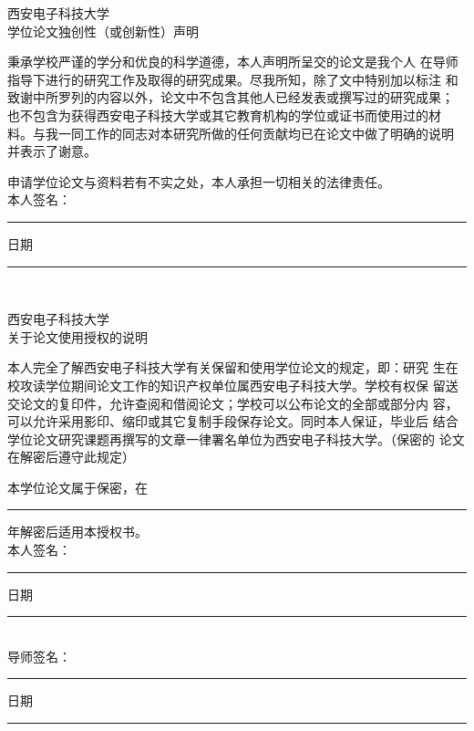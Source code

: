 \begin{center}
\heiti{}西安电子科技大学\\[5mm]
	学位论文独创性（或创新性）声明
\end{center}\vspace{1cm}

\songti{}秉承学校严谨的学分和优良的科学道德，本人声明所呈交的论文是我个人
在导师指导下进行的研究工作及取得的研究成果。尽我所知，除了文中特别加以标注
和致谢中所罗列的内容以外，论文中不包含其他人已经发表或撰写过的研究成果；
也不包含为获得西安电子科技大学或其它教育机构的学位或证书而使用过的材
料。与我一同工作的同志对本研究所做的任何贡献均已在论文中做了明确的说明
并表示了谢意。

申请学位论文与资料若有不实之处，本人承担一切相关的法律责任。\\[3mm]

	本人签名：\rule{2.6cm}{0.75pt}  \hspace{3cm}  日期\rule{3cm}{0.75pt}\\[2cm]
	
\begin{center}
\heiti{}西安电子科技大学\\[5mm]
	关于论文使用授权的说明
\end{center}\vspace{1cm}

\songti{}本人完全了解西安电子科技大学有关保留和使用学位论文的规定，即：研究
生在校攻读学位期间论文工作的知识产权单位属西安电子科技大学。学校有权保
留送交论文的复印件，允许查阅和借阅论文；学校可以公布论文的全部或部分内
容，可以允许采用影印、缩印或其它复制手段保存论文。同时本人保证，毕业后
结合学位论文研究课题再撰写的文章一律署名单位为西安电子科技大学。（保密的
论文在解密后遵守此规定）

本学位论文属于保密，在\rule{6mm}{0.75pt}年解密后适用本授权书。\\[3mm]

	本人签名：\rule{2.6cm}{0.75pt}  \hspace{3cm}  日期\rule{3cm}{0.75pt}\\[3mm]

	导师签名：\rule{2.6cm}{0.75pt}  \hspace{3cm}  日期\rule{3cm}{0.75pt}           
